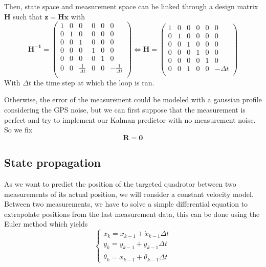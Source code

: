 \documentclass[12pt]{article}
\begin{document}
Then, state space and measurement space can be linked through a design matrix $\mathbf{H}$ such that $\mathbf{z} = \mathbf{H}\mathbf{x}$ with
\begin{equation}
\mathbf{H^{-1}} =
    \begin{pmatrix}
        1 & 0 & 0 & 0 & 0 & 0 \\
        0 & 1 & 0 & 0 & 0 & 0 \\
        0 & 0 & 1 & 0 & 0 & 0 \\
        0 & 0 & 0 & 1 & 0 & 0 \\
        0 & 0 & 0 & 0 & 1 & 0 \\
        0 & 0 & \frac{1}{\Delta{t}} & 0 & 0 & -\frac{1}{\Delta{t}} \\
    \end{pmatrix}
\iff
\mathbf{H} =
    \begin{pmatrix}
        1 & 0 & 0 & 0 & 0 & 0 \\
        0 & 1 & 0 & 0 & 0 & 0 \\
        0 & 0 & 1 & 0 & 0 & 0 \\
        0 & 0 & 0 & 1 & 0 & 0 \\
        0 & 0 & 0 & 0 & 1 & 0 \\
        0 & 0 & 1 & 0 & 0 & -\Delta{t} \\
    \end{pmatrix}
\end{equation}
With $\Delta{t}$ the time step at which the loop is ran.

Otherwise, the error of the measurement could be modeled with a gaussian profile considering the GPS noise, but we can first suppose that the measurement is perfect and try to implement our Kalman predictor with no measurement noise.
So we fix
\begin{equation}
\mathbf{R} = \mathbf{0}
\end{equation}

\subsection{State propagation}
As we want to predict the position of the targeted quadrotor between two measurements of its actual position, we will consider a constant velocity model.
Between two measurements, we have to solve a simple differential equation to extrapolate positions from the last measurement data, this can be done using the Euler method which yields
\begin{equation}
\left\{
    \begin{array}{l}
    x_k = x_{k-1} + \dot{x}_{k-1}\Delta{t} \\
    y_k = y_{k-1} + \dot{y}_{k-1}\Delta{t} \\
    \theta_k = x_{k-1} + \dot{\theta}_{k-1}\Delta{t}
    \end{array}
\right.
\end{equation}
\end{document}
